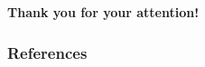 \documentclass[
 ]{beamer}%
\begin{document}


\begin{frame}%
  \bfseries\Huge
  \vspace{1cm}
   {Thank you for your attention!}

\end{frame}


\begin{frame}[allowframebreaks]
    \frametitle{References}
    
    
\end{frame}
\end{document}
